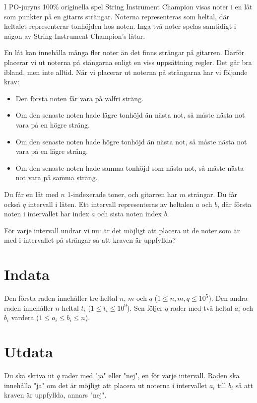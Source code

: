 
I PO-juryns 100\% originella spel String Instrument Champion visas noter i en låt som punkter på en gitarrs strängar.
Noterna representeras som heltal, där heltalet representerar tonhöjden hos noten.
Inga två noter spelas samtidigt i någon av String Instrument Champion's låtar.

En låt kan innehålla många fler noter än det finns strängar på gitarren.
Därför placerar vi ut noterna på stängarna enligt en viss uppsättning regler.
Det går bra ibland, men inte alltid. När vi placerar ut noterna på strängarna har vi följande krav:
\begin{itemize}
\item Den första noten får vara på valfri sträng.
\item Om den senaste noten hade lägre tonhöjd än nästa not, så måste nästa not vara på en högre sträng.
\item Om den senaste noten hade högre tonhöjd än nästa not, så måste nästa not vara på en lägre sträng.
\item Om den senaste noten hade samma tonhöjd som nästa not, så måste nästa not vara på samma sträng.
\end{itemize}

Du får en låt med $n$ 1-indexerade toner, och gitarren har $m$ strängar. Du får också $q$ intervall i låten.
Ett intervall representeras av heltalen $a$ och $b$, där första noten i intervallet har index $a$ och sista noten index $b$.

För varje intervall undrar vi nu: är det möjligt att placera ut de noter som är med i intervallet på strängar så att kraven är uppfyllda?

\section*{Indata}
Den första raden innehåller tre heltal $n$, $m$ och $q$ ($1 \leq n, m, q \leq 10^5$).
Den andra raden innehåller $n$ heltal $t_i$ ($1 \leq t_i \leq 10^9$).
Sen följer $q$ rader med två heltal $a_i$ och $b_i$ vardera ($1 \leq a_i \leq b_i \leq n$).

\section*{Utdata}
Du ska skriva ut $q$ rader med "ja" eller "nej", en för varje intervall.
Raden ska innehålla "ja" om det är möjligt att placera ut noterna i intervallet $a_i$ till $b_i$ så att kraven är uppfyllda, annars "nej".

